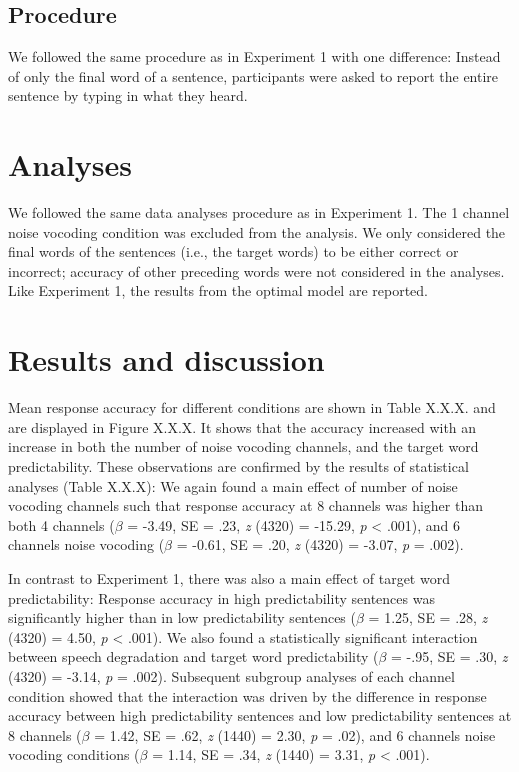 \documentclass[a4paper, nobind]{templates/ociamthesis}
\begin{document}
\hypertarget{procedure-1}{%
\subsection{Procedure}\label{procedure-1}}

We followed the same procedure as in Experiment 1 with one difference:
Instead of only the final word of a sentence, participants were asked to report the entire sentence by typing in what they heard.

\hypertarget{analyses-1}{%
\section{Analyses}\label{analyses-1}}

We followed the same data analyses procedure as in Experiment 1.
The 1 channel noise vocoding condition was excluded from the analysis.
We only considered the final words of the sentences (i.e., the target words) to be either correct or incorrect; accuracy of other preceding words were not considered in the analyses.
Like Experiment 1, the results from the optimal model are reported.

\hypertarget{results-and-discussion-1}{%
\section{Results and discussion}\label{results-and-discussion-1}}

Mean response accuracy for different conditions are shown in Table X.X.X. and are displayed in Figure X.X.X.
It shows that the accuracy increased with an increase in both the number of noise vocoding channels, and the target word predictability.
These observations are confirmed by the results of statistical analyses (Table X.X.X):
We again found a main effect of number of noise vocoding channels such that response accuracy at 8 channels was higher than both 4 channels (\(\beta\) = -3.49, SE = .23, \emph{z} (4320) = -15.29, \emph{p} \textless{} .001), and 6 channels noise vocoding (\(\beta\) = -0.61, SE = .20, \emph{z} (4320) = -3.07, \emph{p} = .002).

In contrast to Experiment 1, there was also a main effect of target word predictability:
Response accuracy in high predictability sentences was significantly higher than in low predictability sentences (\(\beta\) = 1.25, SE = .28, \emph{z} (4320) = 4.50, \emph{p} \textless{} .001).
We also found a statistically significant interaction between speech degradation and target word predictability (\(\beta\) = -.95, SE = .30, \emph{z} (4320) = -3.14, \emph{p} = .002).
Subsequent subgroup analyses of each channel condition showed that the interaction was driven by the difference in response accuracy between high predictability sentences and low predictability sentences at 8 channels (\(\beta\) = 1.42, SE = .62, \emph{z} (1440) = 2.30, \emph{p} = .02), and 6 channels noise vocoding conditions (\(\beta\) = 1.14, SE = .34, \emph{z} (1440) = 3.31, \emph{p} \textless{} .001).
\end{document}

